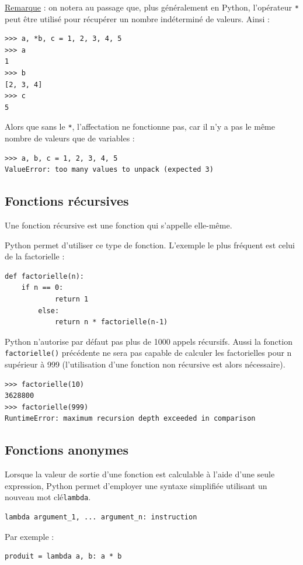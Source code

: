 \documentclass[12pt, a4paper]{article}
\begin{document}
\underline{Remarque} : on notera au passage que, plus généralement en Python, l'opérateur \lstinline{*} peut être utilisé pour récupérer un nombre indéterminé de valeurs. Ainsi :
\begin{lstlisting}
>>> a, *b, c = 1, 2, 3, 4, 5
>>> a
1
>>> b
[2, 3, 4]
>>> c
5
\end{lstlisting}

Alors que sans le \lstinline{*}, l'affectation ne fonctionne pas, car il n'y a pas le même nombre de valeurs que de variables :
\begin{lstlisting}
>>> a, b, c = 1, 2, 3, 4, 5
ValueError: too many values to unpack (expected 3)
\end{lstlisting}


\subsection{Fonctions récursives}
Une fonction récursive est une fonction qui s'appelle elle-même.

Python permet d'utiliser ce type de fonction. L'exemple le plus fréquent est celui de la factorielle :
\begin{lstlisting}
def factorielle(n):
    if n == 0:
		    return 1
		else:
		    return n * factorielle(n-1)
\end{lstlisting}

Python n'autorise par défaut pas plus de 1000 appels récursifs. Aussi la fonction \lstinline{factorielle()} précédente ne sera pas capable de calculer les factorielles pour n supérieur à 999 (l'utilisation d'une fonction non récursive est alors nécessaire).
\begin{lstlisting}
>>> factorielle(10)
3628800
>>> factorielle(999)
RuntimeError: maximum recursion depth exceeded in comparison
\end{lstlisting}


\subsection{Fonctions anonymes}
Lorsque la valeur de sortie d'une fonction est calculable à l'aide d'une seule expression, Python permet d'employer une syntaxe simplifiée utilisant un nouveau mot clé\lstinline{lambda}.
\begin{lstlisting}
lambda argument_1, ... argument_n: instruction
\end{lstlisting}

Par exemple : 
\begin{lstlisting}
produit = lambda a, b: a * b
\end{lstlisting}
\end{document}
